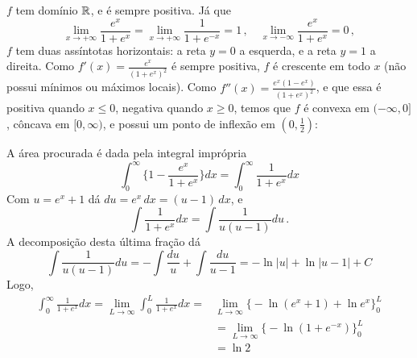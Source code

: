 \begin{Solution}{11.4}
$f$ tem domínio $\mathbb{R}$, e é sempre positiva. Já que
$$
\lim_{x\to +\infty} \frac{e^x}{1+e^x}=\lim_{x\to+\infty}
\frac{1}{1+e^{-x}}=1\,,\quad
\lim_{x\to-\infty} \frac{e^x}{1+e^x}=0\,,
$$
$f$ tem duas assíntotas horizontais: a reta $y=0$ a esquerda, e a reta $y=1$ a
direita.
Como $f'(x)=\frac{e^x}{(1+e^x)^2}$ é sempre positiva, $f$ é crescente em todo
$x$ (não possui mínimos ou máximos locais). Como
$f''(x)=\frac{e^x(1-e^x)}{(1+e^x)^2}$,
e que essa é positiva quando $x\leq 0$, negativa quando $x\geq 0$, temos que $f$
é convexa em $(-\infty,0]$, côncava em $[0,\infty)$, e possui um ponto de
inflexão em $(0,\tfrac12)$:
\begin{center}
\begin{bmlimage}\end{bmlimage}
\end{center}

A área procurada é dada pela integral imprópria
$$\int_0^\infty\Big\{1-\frac{e^x}{1+e^x}\Big\}dx=\int_0^\infty\frac{1}{1+e^x}
dx$$
Com $u=e^x+1$ dá $du=e^x\,dx=(u-1)\,dx$, e
$$
\int \frac{1}{1+e^x}dx=\int\frac{1}{u(u-1)}du\,.
$$
A decomposição desta última fração dá
$$
\int\frac{1}{u(u-1)}du=-\int\frac{du}{u}+\int \frac{du}{u-1}=-\ln|u|+\ln|u-1|+C
$$
Logo,
\begin{align*}
\int_0^\infty\frac{1}{1+e^x}dx=\lim_{L\to\infty}\int_0^L\frac{1}{1+e^x}dx=
&\lim_{L\to\infty}\Big\{
-\ln (e^x+1)+\ln e^x
\Big\}_0^L\\
&=\lim_{L\to\infty}\Big\{
-\ln (1+e^{-x})
\Big\}_0^L\\
&=\ln 2
\end{align*}
\end{Solution}
